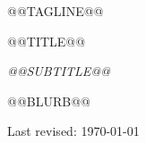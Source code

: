 \begin{titlepage}
  \centering
  \vspace*{3cm}
  {\Large\sffamily\color{inkmuted} @@TAGLINE@@\par}
  \vspace{0.5cm}
  {\huge\rmfamily\color{inkdark} @@TITLE@@\par}
  \vspace{0.5cm}
  {\normalsize\itshape\color{inkmuted} @@SUBTITLE@@\par}
  \vspace{3cm}
  {\normalsize\color{inkbody} @@BLURB@@\par}
  \vfill
  {\small\color{inkdim} Last revised: \today}
\end{titlepage}
